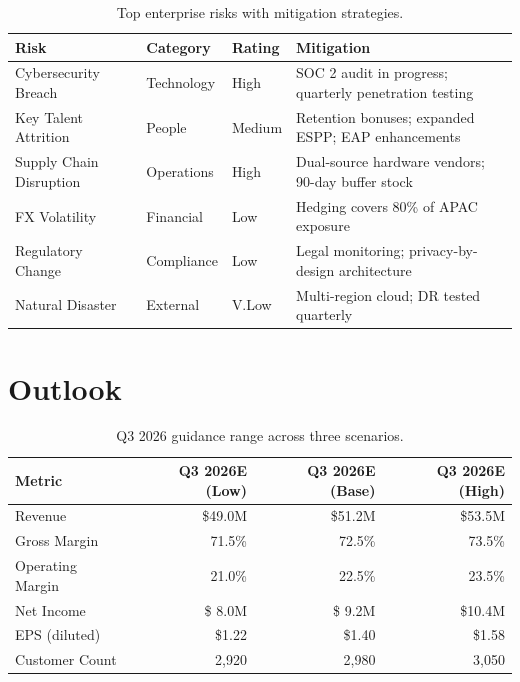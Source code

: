 \documentclass[
    language=english,
    doctype=quarterly-report,
    institution=none,
]{../../omnilatex}
\begin{document}
\begin{table}[h]
    \centering
    \begin{tabular}{lllp{5.5cm}}
        \toprule
        \textbf{Risk} & \textbf{Category} & \textbf{Rating} & \textbf{Mitigation} \\
        \midrule
        Cybersecurity Breach    & Technology & \cellcolor{red!20}High     & SOC 2 audit in progress; quarterly penetration testing \\
        Key Talent Attrition    & People     & \cellcolor{yellow!20}Medium & Retention bonuses; expanded ESPP; EAP enhancements \\
        Supply Chain Disruption & Operations & \cellcolor{orange!20}High   & Dual-source hardware vendors; 90-day buffer stock \\
        FX Volatility           & Financial  & \cellcolor{green!20}Low    & Hedging covers 80\% of APAC exposure \\
        Regulatory Change       & Compliance & \cellcolor{green!20}Low    & Legal monitoring; privacy-by-design architecture \\
        Natural Disaster        & External   & \cellcolor{green!20}V.Low  & Multi-region cloud; DR tested quarterly \\
        \bottomrule
    \end{tabular}
    \caption{Top enterprise risks with mitigation strategies.}
\end{table}

\section{Outlook}

\begin{table}[h]
    \centering
    \begin{tabular}{lrrr}
        \toprule
        \textbf{Metric} & \textbf{Q3 2026E (Low)} & \textbf{Q3 2026E (Base)} & \textbf{Q3 2026E (High)} \\
        \midrule
        Revenue           & \$49.0M & \$51.2M & \$53.5M \\
        Gross Margin      & 71.5\%  & 72.5\%  & 73.5\% \\
        Operating Margin  & 21.0\%  & 22.5\%  & 23.5\% \\
        Net Income        & \$ 8.0M & \$ 9.2M & \$10.4M \\
        EPS (diluted)     & \$1.22  & \$1.40  & \$1.58 \\
        Customer Count    & 2,920   & 2,980   & 3,050 \\
        \bottomrule
    \end{tabular}
    \caption{Q3 2026 guidance range across three scenarios.}
\end{table}
\end{document}

